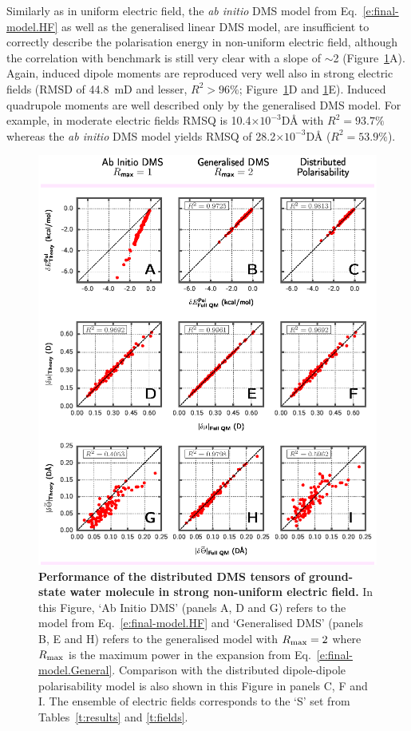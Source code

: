 \documentclass[aip,amsmath,amssymb,reprint,floatfix]{revtex4-1}
\begin{document}
Similarly as in uniform electric field, 
the \emph{ab initio} DMS model from Eq.~\eqref{e:final-model.HF} 
as well as the generalised linear DMS model, are insufficient to correctly describe the polarisation energy 
in non\hyp{}uniform electric field, although the correlation with benchmark is still very clear with a slope of $\sim$2
(Figure~\ref{f:fig-2}A). Again, induced dipole moments are reproduced very well also
in strong electric fields (RMSD of 44.8~mD and lesser, $R^2>96\%$; Figure~\ref{f:fig-2}D and \ref{f:fig-2}E).
Induced quadrupole moments are well described only by the generalised DMS model.
For example, in moderate electric fields RMSQ is 10.4$\times 10^{-3}$D\AA{ }with $R^2=93.7\%$
whereas the \emph{ab initio} DMS model yields RMSQ of 28.2$\times 10^{-3}$D\AA{ }($R^2=53.9\%$).

\begin{figure}[h]
\includegraphics[width=\textwidth]{fig-2.eps}
\caption{\label{f:fig-2} {\bf Performance of the distributed DMS tensors of ground\hyp{}state water molecule in strong
non\hyp{}uniform electric field.}
In this Figure, `Ab Initio DMS' (panels A, D and G) 
refers to the model from Eq.~\eqref{e:final-model.HF} and
`Generalised DMS' (panels B, E and H) 
refers to the generalised model with $R_{\rm max}=2$ 
where $R_{\rm max}$ is the maximum power
in the expansion from Eq.~\eqref{e:final-model.General}.
Comparison with the distributed dipole\hyp{}dipole polarisability model 
is also shown in this Figure in panels C, F and I. 
The ensemble of electric fields corresponds to the `S' set
from Tables~\ref{t:results} and \ref{t:fields}.}
\end{figure}
\end{document}
